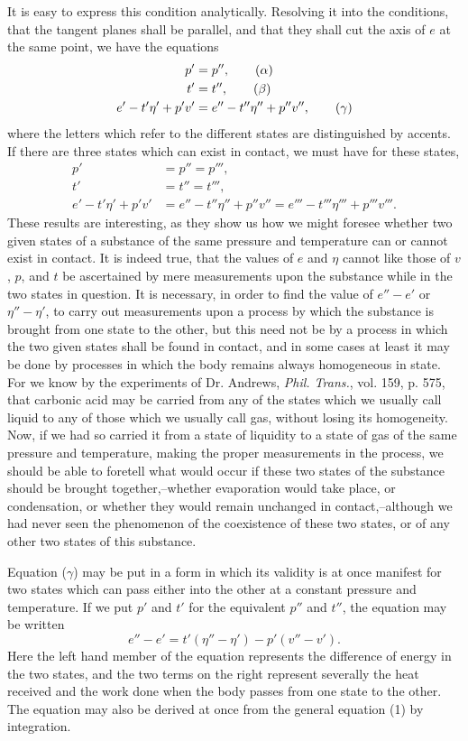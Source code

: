 \documentclass[11pt]{article}
\begin{document}
{It is easy to express this condition analytically. Resolving it into the conditions, that the tangent planes shall be parallel, and that they shall cut the axis of $e$ at the same point, we have the equations
\begin{align}
p'&=p'', \tag{\ensuremath{\alpha}}\\
t'&=t'', \tag{\ensuremath{\beta}}\\
e'-t'\eta'+p'v'&=e''-t''\eta''+p''v'', \tag{\ensuremath{\gamma}}
\end{align}
where the letters which refer to the different states are distinguished by accents. If there are three states which can exist in contact, we must have for these states,
\begin{align*}
p'&=p''=p''',\\
t'&=t''=t''',\\
e'-t'\eta'+p'v'&=e''-t''\eta''+p''v''=e'''-t'''\eta'''+p'''v'''.
\end{align*}
These results are interesting, as they show us how we might foresee whether two given states of a substance of the same pressure and temperature can or cannot exist in contact. It is indeed true, that the values of $e$ and $\eta$ cannot like those of $v$, $p$, and $t$ be ascertained by mere measurements upon the substance while in the two states in question. It is necessary, in order to find the value of $e''-e'$ or $\eta''-\eta'$, to carry out measurements upon a process by which the substance is brought from one state to the other, but this need not be by a process in which the two given states shall be found in contact, and in some cases at least it may be done by processes in which the body remains always homogeneous in state. For we know by the experiments of Dr. Andrews, \emph{Phil. Trans.}, vol. 159, p. 575, that carbonic acid may be carried from any of the states which we usually call liquid to any of those which we usually call gas, without losing its homogeneity. Now, if we had so carried it from a state of liquidity to a state of gas of the same pressure and temperature, making the proper measurements in the process, we should be able to foretell what would occur if these two states of the substance should be brought together,--whether evaporation would take place, or condensation, or whether they would remain unchanged in contact,--although we had never seen the phenomenon of the coexistence of these two states, or of any other two states of this substance.

Equation ($\gamma$) may be put in a form in which its validity is at once manifest for two states which can pass either into the other at a constant pressure and temperature. If we put $p'$ and $t'$ for the equivalent $p''$ and $t''$, the equation may be written
\[
e''-e'=t'(\eta''-\eta')-p'(v''-v').
\]
Here the left hand member of the equation represents the difference of energy in the two states, and the two terms on the right represent severally the heat received and the work done when the body passes from one state to the other. The equation may also be derived at once from the general equation (1) by integration.

}
\end{document}
